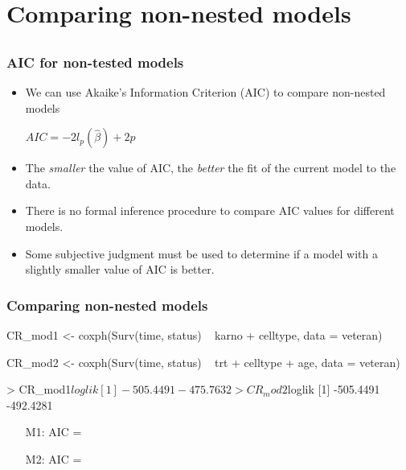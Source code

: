 \section[Non-nested models]{Comparing non-nested models}
\subsection{}
\begin{frame}
\end{frame}

\begin{frame}
\frametitle{AIC for non-tested models}
\begin{itemize}
\item We can use Akaike's Information Criterion (AIC) to compare non-nested models
\item[]
\item[] $AIC = -2l_p(\hat{\beta})+2p$
\item[]
\item The \emph{smaller} the value of AIC, the \emph{better} the fit of the current model to the data.
\item There is no formal inference procedure to compare AIC values for different models.
\item Some subjective judgment must be used to determine if a model with a slightly smaller value of AIC is better.
\end{itemize}
\end{frame}

\begin{frame}[fragile]
\frametitle{Comparing non-nested models}
\begin{Rcode}{0.0}
CR_mod1 <- coxph(Surv(time, status) ~ karno + celltype,
                 data = veteran)

CR_mod2 <- coxph(Surv(time, status) ~ trt + celltype + age,
                data = veteran)
\end{Rcode}
\begin{minipage}{0.45\textwidth}
\begin{Rout}{0.0}
> CR_mod1$loglik
[1] -505.4491 -475.7632

> CR_mod2$loglik
[1] -505.4491 -492.4281
\end{Rout}
\end{minipage}
\blankcolumn
\begin{minipage}{0.45\textwidth}
\begin{enumerate}
\item[M1:] AIC =
\item[]
\item[]
\item[M2:] AIC =
\item[]
\item[]
\end{enumerate}
\end{minipage}
\end{frame}



